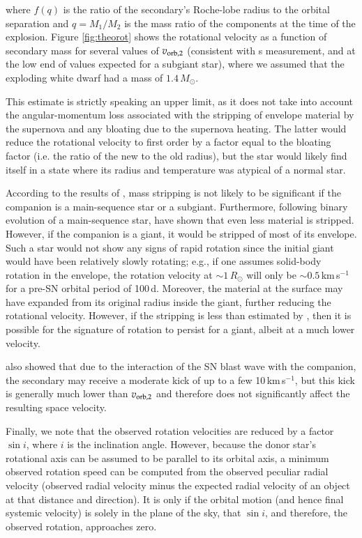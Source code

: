 where $f(q)$ is the ratio of the secondary's Roche-lobe radius to the
orbital separation \citep[e.g., given by][]{1983ApJ...268..368E} and
$q=M_1/M_2$ is the mass ratio of the components at the time of the
explosion. Figure \ref{fig:theorot} shows the rotational velocity as a
function of secondary mass for several values of $v_{\rm orb, 2}$ (consistent with \rl s measurement, and at the low end of values expected for a subgiant star),
where we assumed that the exploding white dwarf had a mass of
$1.4\,M_\odot$.

This estimate is strictly speaking an upper limit, as it does not
take into account the angular-momentum loss associated with the
stripping of envelope material by the supernova and any bloating due
to the supernova heating. The latter would reduce the rotational
velocity to first order by a factor equal to the bloating
factor (i.e. the ratio of the new to the old radius), but the
star would likely find itself in a state where its radius and
temperature was atypical of a normal star. 

According to the results of  \citet{2000ApJS..128..615M}, mass stripping is
not likely to be significant if the companion is a main-sequence star
or a subgiant. Furthermore, following binary evolution of a main-sequence star, \citet{2008A&A...489..943P} have shown that even less material is stripped. However, if the companion is a giant, it would be
stripped of most of its envelope.  Such a star would not show any
signs of rapid rotation since the initial giant would have been
relatively slowly rotating; e.g., if one assumes solid-body rotation
in the envelope, the rotation velocity at $\sim 1\, R_\odot$ will only
be $\sim 0.5\,$km\,s$^{-1}$ for a pre-SN orbital period of
100\,d. Moreover, the material at the surface may have expanded from
its original radius inside the giant, further reducing the rotational
velocity. However, if the stripping is less than estimated by  \citet{2000ApJS..128..615M}, then it is possible for the signature of rotation to persist for a giant, albeit at a much lower velocity.

 \citet{2000ApJS..128..615M} also showed that due to the interaction
of the SN blast wave with the companion, the secondary may receive
a moderate kick of up to a few 10\,km\,s$^{-1}$, but this kick
is generally much lower than $v_{\rm orb,2}$ and therefore does
not significantly affect the resulting space velocity.

Finally, we note that the observed rotation velocities are reduced by
a factor $\sin i$, where $i$ is the inclination angle.  However,
because the donor star's rotational axis can be assumed to be parallel
to its orbital axis, a minimum observed rotation speed can be computed
from the observed peculiar radial velocity (observed radial velocity
minus the expected radial velocity of an object at that distance and
direction). It is only if the orbital motion (and hence final systemic
velocity) is solely in the plane of the sky, that $\sin{i}$, and
therefore, the observed rotation, approaches
zero.\label{rotation_expl}

